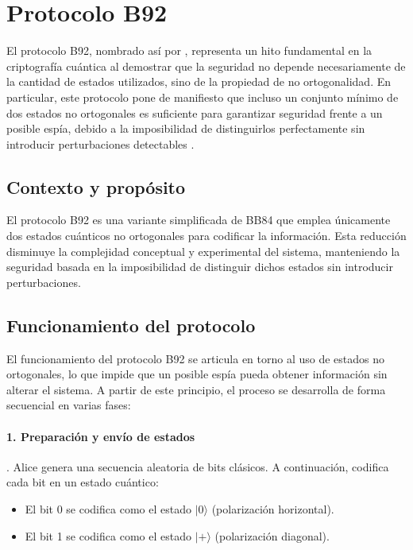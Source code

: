 \section{Protocolo B92}

El protocolo B92, nombrado así por \cite{bennett1992}, representa un hito fundamental en la criptografía cuántica al demostrar que la seguridad no depende necesariamente de la cantidad de estados utilizados, sino de la propiedad de no ortogonalidad. En particular, este protocolo pone de manifiesto que incluso un conjunto mínimo de dos estados no ortogonales es suficiente para garantizar seguridad frente a un posible espía, debido a la imposibilidad de distinguirlos perfectamente sin introducir perturbaciones detectables \citep{gisin2002}.

\subsection{Contexto y propósito}

El protocolo B92 es una variante simplificada de BB84 \citep{bennett1984} que emplea únicamente dos estados cuánticos no ortogonales \citep{schrodinger1926} para codificar la información. Esta reducción disminuye la complejidad conceptual y experimental del sistema, manteniendo la seguridad basada en la imposibilidad de distinguir dichos estados sin introducir perturbaciones.

\subsection{Funcionamiento del protocolo}

El funcionamiento del protocolo B92 se articula en torno al uso de estados no ortogonales, lo que impide que un posible espía pueda obtener información sin alterar el sistema. A partir de este principio, el proceso se desarrolla de forma secuencial en varias fases:

\paragraph{1. Preparación y envío de estados}. Alice genera una secuencia aleatoria de bits clásicos. A continuación, 
codifica cada bit en un estado cuántico:

\begin{itemize}
    \item El bit 0 se codifica como el estado $|0\rangle$ (polarización horizontal).
    \item El bit 1 se codifica como el estado $|{+}\rangle$ (polarización diagonal).
\end{itemize}

